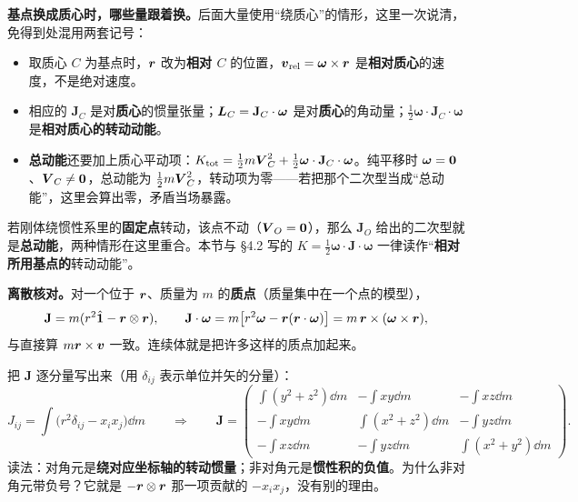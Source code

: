 \documentclass[11pt]{ctexart}
\newcommand{\ten}[1]{\mathbf{#1}}
\newcommand{\unitd}{\hat{\ten{1}}}
\let\origsubhdr\subhdr
\renewcommand{\subhdr}[1]{\par\needspace{3\baselineskip}\origsubhdr{#1}}
\begin{document}
\textbf{基点换成质心时，哪些量跟着换。}后面大量使用“绕质心”的情形，这里一次说清，免得到处混用两套记号：
\begin{itemize}[leftmargin=1.8em,itemsep=2pt]
\item 取质心 $C$ 为基点时，$\boldsymbol{r}$ 改为\textbf{相对 $C$} 的位置，$\boldsymbol{v}_{\rm rel}=\boldsymbol\omega\times\boldsymbol{r}$ 是\textbf{相对质心}的速度，不是绝对速度。
\item 相应的 $\ten J_C$ 是对\textbf{质心}的惯量张量；$\vect L_C=\ten J_C\cdot\boldsymbol\omega$ 是对\textbf{质心}的角动量；$\frac12\boldsymbol\omega\cdot\ten J_C\cdot\boldsymbol\omega$ 是\textbf{相对质心的转动动能}。
\item \textbf{总动能}还要加上质心平动项：$K_{\rm tot}=\frac12m\vect V_C^2+\frac12\boldsymbol\omega\cdot\ten J_C\cdot\boldsymbol\omega$。纯平移时 $\boldsymbol\omega=\boldsymbol{0}$、$\boldsymbol{V}_C\ne\boldsymbol{0}$，总动能为 $\frac12m\boldsymbol{V}_C^2$，转动项为零——若把那个二次型当成“总动能”，这里会算出零，矛盾当场暴露。
\end{itemize}
若刚体绕惯性系里的\textbf{固定点}转动，该点不动（$\boldsymbol{V}_O=\boldsymbol{0}$），那么 $\ten J_O$ 给出的二次型就是\textbf{总动能}，两种情形在这里重合。本节与 \S4.2 写的 $K=\frac12\boldsymbol\omega\cdot\ten J\cdot\boldsymbol\omega$ 一律读作“\textbf{相对所用基点的}转动动能”。

\textbf{离散核对。}对一个位于 $\boldsymbol{r}$、质量为 $m$ 的\textbf{质点}（质量集中在一个点的模型），
\[
\ten J=m(r^2\unitd-\vect r\otimes\vect r),
\qquad
\ten J\cdot\boldsymbol\omega=m\bigl[r^2\boldsymbol\omega-\vect r(\vect r\cdot\boldsymbol\omega)\bigr]=m\,\vect r\times(\boldsymbol\omega\times\vect r),
\]
与直接算 $m\boldsymbol{r}\times\boldsymbol{v}$ 一致。连续体就是把许多这样的质点加起来。

\label{subsec:inertia-components}

把 $\ten J$ 逐分量写出来（用 $\delta_{ij}$ 表示单位并矢的分量）：
\[
J_{ij}=\int\bigl(r^2\delta_{ij}-x_ix_j\bigr)\dd m
\qquad\Longrightarrow\qquad
\ten J=
\begin{pmatrix}
\int(y^2+z^2)\dd m & -\int xy\dd m & -\int xz\dd m\\[3pt]
-\int xy\dd m & \int(x^2+z^2)\dd m & -\int yz\dd m\\[3pt]
-\int xz\dd m & -\int yz\dd m & \int(x^2+y^2)\dd m
\end{pmatrix}.
\]
读法：对角元是\textbf{绕对应坐标轴的转动惯量}；非对角元是\textbf{惯性积的负值}。为什么非对角元带负号？它就是 $-\boldsymbol{r}\otimes\boldsymbol{r}$ 那一项贡献的 $-x_ix_j$，没有别的理由。
\end{document}
